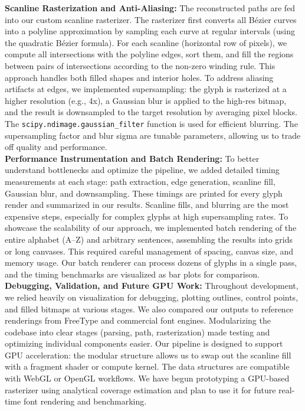 \documentclass[11pt]{article}
\begin{document}
\textbf{Scanline Rasterization and Anti-Aliasing:} The reconstructed paths are fed into our custom scanline rasterizer. The rasterizer first converts all Bézier curves into a polyline approximation by sampling each curve at regular intervals (using the quadratic Bézier formula). For each scanline (horizontal row of pixels), we compute all intersections with the polyline edges, sort them, and fill the regions between pairs of intersections according to the non-zero winding rule. This approach handles both filled shapes and interior holes. To address aliasing artifacts at edges, we implemented supersampling: the glyph is rasterized at a higher resolution (e.g., 4x), a Gaussian blur is applied to the high-res bitmap, and the result is downsampled to the target resolution by averaging pixel blocks. The \texttt{scipy.ndimage.gaussian\_filter} function is used for efficient blurring. The supersampling factor and blur sigma are tunable parameters, allowing us to trade off quality and performance. \\

\textbf{Performance Instrumentation and Batch Rendering:} To better understand bottlenecks and optimize the pipeline, we added detailed timing measurements at each stage: path extraction, edge generation, scanline fill, Gaussian blur, and downsampling. These timings are printed for every glyph render and summarized in our results. Scanline fills, and blurring are the most expensive steps, especially for complex glyphs at high supersampling rates. To showcase the scalability of our approach, we implemented batch rendering of the entire alphabet (A–Z) and arbitrary sentences, assembling the results into grids or long canvases. This required careful management of spacing, canvas size, and memory usage. Our batch renderer can process dozens of glyphs in a single pass, and the timing benchmarks are visualized as bar plots for comparison. \\

\textbf{Debugging, Validation, and Future GPU Work:} Throughout development, we relied heavily on visualization for debugging, plotting outlines, control points, and filled bitmaps at various stages. We also compared our outputs to reference renderings from FreeType and commercial font engines. Modularizing the codebase into clear stages (parsing, path, rasterization) made testing and optimizing individual components easier. Our pipeline is designed to support GPU acceleration: the modular structure allows us to swap out the scanline fill with a fragment shader or compute kernel. The data structures are compatible with WebGL or OpenGL workflows. We have begun prototyping a GPU-based rasterizer using analytical coverage estimation and plan to use it for future real-time font rendering and benchmarking. \\
\end{document}
